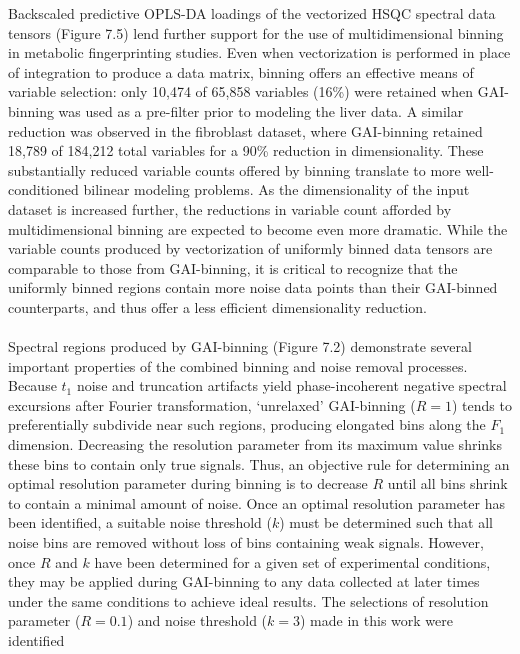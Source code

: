 \begin{doublespace}
Backscaled predictive OPLS-DA loadings of the vectorized \hcnmr{} HSQC spectral
data tensors (Figure 7.5) lend further support for the use of multidimensional
binning in metabolic fingerprinting studies. Even when vectorization is
performed in place of integration to produce a data matrix, binning offers an
effective means of variable selection: only 10,474 of 65,858 variables (16\%)
were retained when GAI-binning was used as a pre-filter prior to modeling the
liver data. A similar reduction was observed in the fibroblast dataset, where
GAI-binning retained 18,789 of 184,212 total variables for a 90\% reduction in
dimensionality. These substantially reduced variable counts offered by binning
translate to more well-conditioned bilinear modeling problems. As the
dimensionality of the input dataset is increased further, the reductions in
variable count afforded by multidimensional binning are expected to become even
more dramatic. While the variable counts produced by vectorization of uniformly
binned data tensors are comparable to those from GAI-binning, it is critical to
recognize that the uniformly binned regions contain more noise data points than
their GAI-binned counterparts, and thus offer a less efficient dimensionality
reduction.
\\\\
Spectral regions produced by GAI-binning (Figure 7.2) demonstrate several
important properties of the combined binning and noise removal processes.
Because $t_1$ noise and truncation artifacts yield phase-incoherent negative
spectral excursions after Fourier transformation, `unrelaxed' GAI-binning
($R = 1$) tends to preferentially subdivide near such regions, producing
elongated bins along the $F_1$ dimension. Decreasing the resolution parameter
from its maximum value shrinks these bins to contain only true signals. Thus,
an objective rule for determining an optimal resolution parameter during
binning is to decrease $R$ until all bins shrink to contain a minimal amount
of noise. Once an optimal resolution parameter has been identified, a suitable
noise threshold ($k$) must be determined such that all noise bins are removed
without loss of bins containing weak signals. However, once $R$ and $k$ have
been determined for a given set of experimental conditions, they may be applied
during GAI-binning to any data collected at later times under the same
conditions to achieve ideal results. The selections of resolution parameter
($R = 0.1$) and noise threshold ($k = 3$) made in this work were identified

\end{doublespace}
